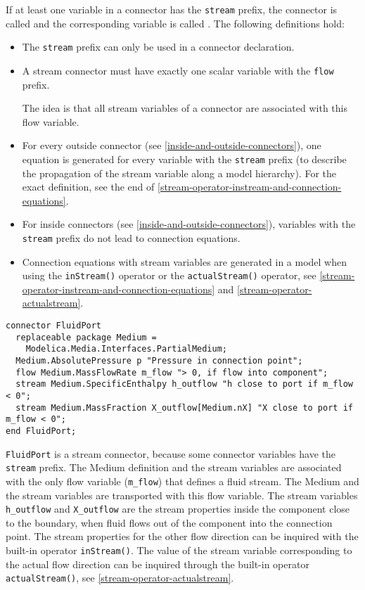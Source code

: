 If at least one variable in a connector has the \lstinline!stream! prefix,
the connector is called  and the corresponding
variable is called . The following definitions hold:
\begin{itemize}
\item
  The \lstinline!stream! prefix can only be used in a connector
  declaration.
\item
  A stream connector must have exactly one scalar variable with the \lstinline!flow! prefix.
  \begin{nonnormative}
  The idea is that all stream variables of a connector are associated with this flow variable.
  \end{nonnormative}
\item
  For every outside connector (see \autoref{inside-and-outside-connectors}), one
  equation is generated for every variable with the \lstinline!stream!
  prefix (to describe the propagation of the stream variable
  along a model hierarchy). For the exact definition, see the end of
  \autoref{stream-operator-instream-and-connection-equations}.
\item
  For inside connectors (see \autoref{inside-and-outside-connectors}), variables
  with the \lstinline!stream! prefix do not lead to connection equations.
\item
  Connection equations with stream variables are generated in a model
  when using the \lstinline!inStream()! operator or the
  \lstinline!actualStream()! operator, see \autoref{stream-operator-instream-and-connection-equations}
  and \autoref{stream-operator-actualstream}.
\end{itemize}

\begin{example}
\begin{lstlisting}[language=modelica]
connector FluidPort
  replaceable package Medium =
    Modelica.Media.Interfaces.PartialMedium;
  Medium.AbsolutePressure p "Pressure in connection point";
  flow Medium.MassFlowRate m_flow "> 0, if flow into component";
  stream Medium.SpecificEnthalpy h_outflow "h close to port if m_flow < 0";
  stream Medium.MassFraction X_outflow[Medium.nX] "X close to port if m_flow < 0";
end FluidPort;
\end{lstlisting}
\lstinline!FluidPort! is a stream connector, because some connector variables
have the \lstinline!stream! prefix. The Medium definition and the stream
variables are associated with the only flow variable (\lstinline!m_flow!) that
defines a fluid stream. The Medium and the stream variables are
transported with this flow variable. The stream variables \lstinline!h_outflow! and
\lstinline!X_outflow! are the stream properties inside the component close to the
boundary, when fluid flows out of the component into the connection
point. The stream properties for the other flow direction can be
inquired with the built-in operator \lstinline!inStream()!. The value of
the stream variable corresponding to the actual flow direction can be
inquired through the built-in operator \lstinline!actualStream()!, see
\autoref{stream-operator-actualstream}.
\end{example}

